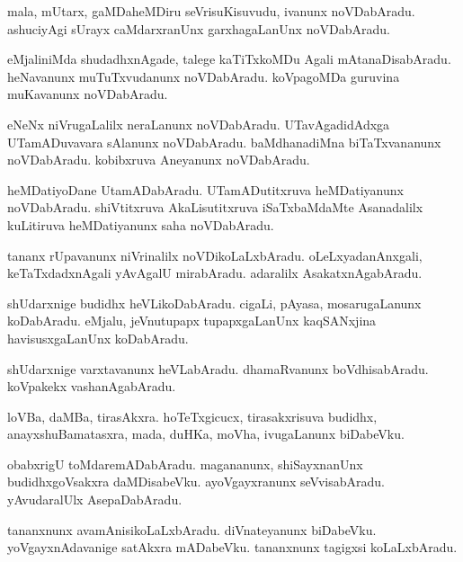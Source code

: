 \documentclass{article}
\begin{document}
\begin{mn}
mala, mUtarx, gaMDaheMDiru seVrisuKisuvudu, ivanunx noVDabAradu. ashuciyAgi sUrayx 
caMdarxranUnx garxhagaLanUnx noVDabAradu.
\end{mn}

\begin{mn}
eMjaliniMda shudadhxnAgade, talege kaTiTxkoMDu Agali mAtanaDisabAradu. heNavanunx muTuTxvudanunx 
noVDabAradu. koVpagoMDa guruvina muKavanunx noVDabAradu.
\end{mn}

\begin{mn}
eNeNx niVrugaLalilx neraLanunx noVDabAradu. UTavAgadidAdxga UTamADuvavara sAlanunx  noVDabAradu.
baMdhanadiMna biTaTxvananunx noVDabAradu. kobibxruva Aneyanunx noVDabAradu.
\end{mn}

\begin{mn}
heMDatiyoDane UtamADabAradu. UTamADutitxruva heMDatiyanunx noVDabAradu. shiVtitxruva 
AkaLisutitxruva iSaTxbaMdaMte Asanadalilx kuLitiruva heMDatiyanunx saha noVDabAradu.
\end{mn}

\begin{mn}
tananx rUpavanunx niVrinalilx noVDikoLaLxbAradu. oLeLxyadanAnxgali, keTaTxdadxnAgali yAvAgalU 
mirabAradu. adaralilx AsakatxnAgabAradu.
\end{mn}

\begin{mn}
shUdarxnige budidhx heVLikoDabAradu. cigaLi, pAyasa, mosarugaLanunx koDabAradu. eMjalu, 
jeVnutupapx tupapxgaLanUnx kaqSANxjina havisusxgaLanUnx koDabAradu.
\end{mn}

\begin{mn}
shUdarxnige varxtavanunx heVLabAradu. dhamaRvanunx boVdhisabAradu. koVpakekx vashanAgabAradu.
\end{mn}

\begin{mn}
loVBa, daMBa, tirasAkxra. hoTeTxgicucx, tirasakxrisuva budidhx, anayxshuBamatasxra, mada, duHKa, 
moVha, ivugaLanunx biDabeVku.
\end{mn}

\begin{mn}
obabxrigU toMdaremADabAradu. magananunx, shiSayxnanUnx budidhxgoVsakxra daMDisabeVku. 
ayoVgayxranunx seVvisabAradu. yAvudaralUlx AsepaDabAradu.
\end{mn}

\begin{mn}
tananxnunx avamAnisikoLaLxbAradu. diVnateyanunx biDabeVku. yoVgayxnAdavanige satAkxra mADabeVku. 
tananxnunx tagigxsi koLaLxbAradu.
\end{mn}
\end{document}
